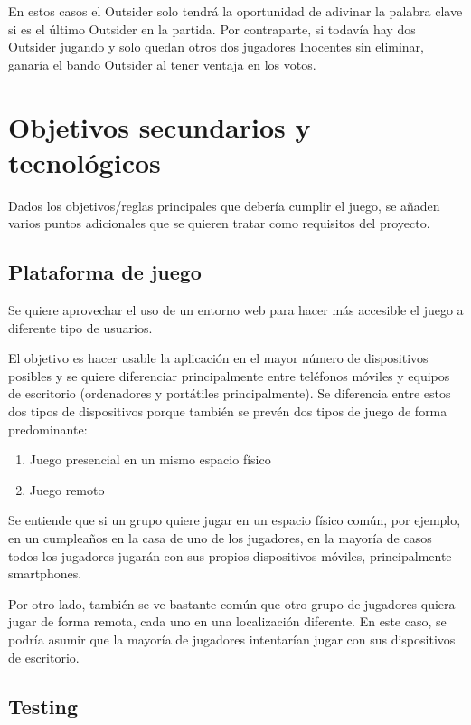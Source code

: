 En estos casos el Outsider solo tendrá la oportunidad de adivinar la palabra clave si es el último Outsider en la partida. Por contraparte, si 
todavía hay dos Outsider jugando y solo quedan otros dos jugadores Inocentes sin eliminar, ganaría el bando Outsider al tener ventaja en los 
votos.

\section{Objetivos secundarios y tecnológicos}

Dados los objetivos/reglas principales que debería cumplir el juego, se añaden varios puntos adicionales que se quieren
tratar como requisitos del proyecto.

\subsection{Plataforma de juego}

Se quiere aprovechar el uso de un entorno web para hacer más accesible el juego a diferente tipo de usuarios.

El objetivo es hacer usable la aplicación en el mayor número de dispositivos posibles y se quiere diferenciar principalmente entre
teléfonos móviles y equipos de escritorio (ordenadores y portátiles principalmente). Se diferencia entre estos dos tipos de
dispositivos porque también se prevén dos tipos de juego de forma predominante:

\begin{enumerate}
    \item Juego presencial en un mismo espacio físico
    \item Juego remoto
\end{enumerate}

Se entiende que si un grupo quiere jugar en un espacio físico común, por ejemplo, en un cumpleaños en la casa de uno de los
jugadores, en la mayoría de casos todos los jugadores jugarán con sus propios dispositivos móviles, principalmente smartphones.

Por otro lado, también se ve bastante común que otro grupo de jugadores quiera jugar de forma remota, cada uno en una
localización diferente. En este caso, se podría asumir que la mayoría de jugadores intentarían jugar con sus dispositivos de
escritorio.

\subsection{Testing}

